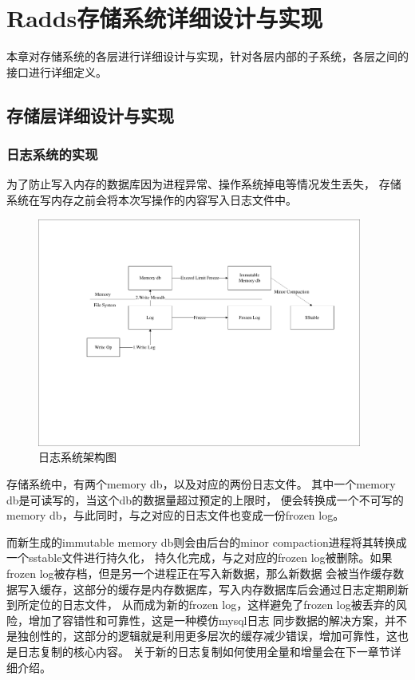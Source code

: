 \section{Radds存储系统详细设计与实现}

	本章对存储系统的各层进行详细设计与实现，针对各层内部的子系统，各层之间的接口进行详细定义。
	
  	\subsection{存储层详细设计与实现}
	


	  \subsubsection{日志系统的实现}
    
	  为了防止写入内存的数据库因为进程异常、操作系统掉电等情况发生丢失，
	  存储系统在写内存之前会将本次写操作的内容写入日志文件中。

   \begin{figure}[H]
	   \centering
	   \includegraphics[width=0.95\textwidth]{pdf/two_log.pdf}
	   \caption{日志系统架构图}
	   \label{two_log}
   \end{figure}
   存储系统中，有两个memory db，以及对应的两份日志文件。
   其中一个memory db是可读写的，当这个db的数据量超过预定的上限时，
   便会转换成一个不可写的memory db，与此同时，与之对应的日志文件也变成一份frozen log。

   而新生成的immutable memory db则会由后台的minor compaction进程将其转换成一个sstable文件进行持久化，
   持久化完成，与之对应的frozen log被删除。如果frozen log被存档，但是另一个进程正在写入新数据，那么新数据
   会被当作缓存数据写入缓存，这部分的缓存是内存数据库，写入内存数据库后会通过日志定期刷新到所定位的日志文件，
   从而成为新的frozen log，这样避免了frozen log被丢弃的风险，增加了容错性和可靠性，这是一种模仿mysql日志
   同步数据的解决方案，并不是独创性的，这部分的逻辑就是利用更多层次的缓存减少错误，增加可靠性，这也是日志复制的核心内容。
   关于新的日志复制如何使用全量和增量会在下一章节详细介绍。

